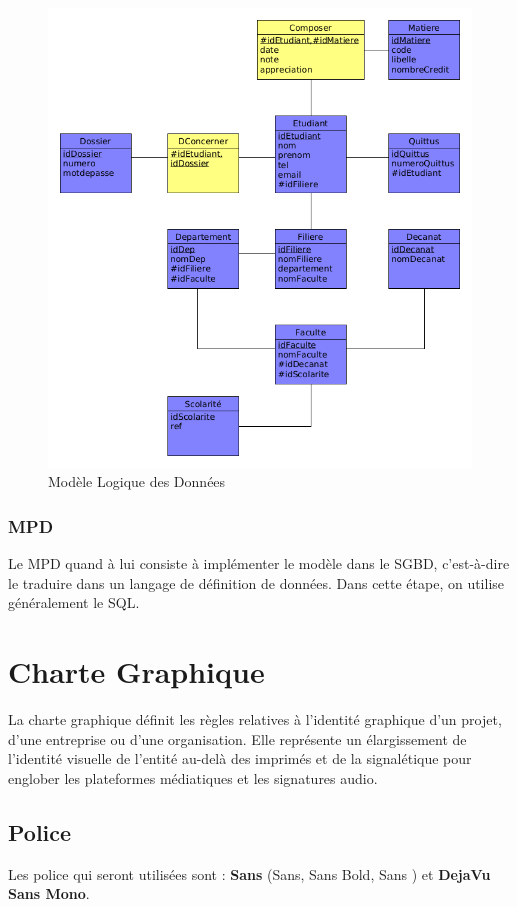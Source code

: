 \documentclass[12pt,a4paper]{article}
\begin{document}
	\begin{figure}[H]
		\centering
		\includegraphics[width=\textwidth]{mld}
		\caption{Modèle Logique des Données}
		\label{fig:figure7}
	\end{figure}

	\subsubsection{MPD}
	Le MPD quand à lui consiste à implémenter le modèle dans le SGBD, c'est-à-dire le traduire dans un langage de définition de données. Dans cette étape, on utilise généralement le SQL.\\
	
	\newpage
	\section{Charte Graphique}
	La charte graphique définit les règles relatives à l'identité graphique d'un projet, d'une entreprise ou d'une organisation. Elle représente un élargissement de l'identité visuelle de l'entité au-delà des imprimés et de la signalétique pour englober les plateformes médiatiques et les signatures audio.
	
	\subsection{Police}
	Les police qui seront utilisées sont : \textbf{Sans} (Sans, Sans Bold, Sans ) et \textbf{DejaVu Sans Mono}.
	
\end{document}

